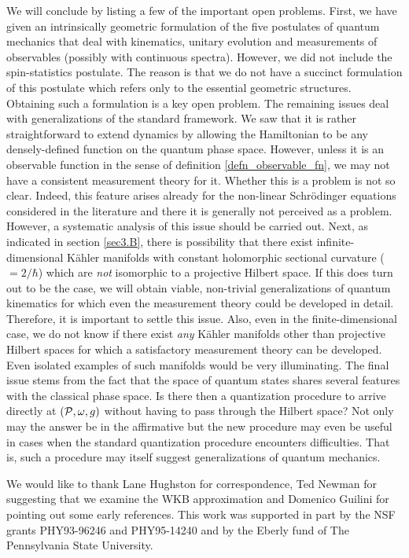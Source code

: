 \documentclass[12pt,aps,eqsecnum,tighten,nofootinbib]{revtex4-2}
\def\P{{\cal P}}
\def\w{\omega}
\begin{document}
We will conclude by listing a few of the important open problems.
First, we have given an intrinsically geometric formulation of the
five postulates of quantum mechanics that deal with kinematics,
unitary evolution and measurements of observables (possibly with
continuous spectra). However, we did not include the spin-statistics
postulate. The reason is that we do not have a succinct formulation of
this postulate which refers only to the essential geometric
structures. Obtaining such a formulation is a key open problem. The
remaining issues deal with generalizations of the standard
framework. We saw that it is rather straightforward to extend dynamics
by allowing the Hamiltonian to be any densely-defined function on the
quantum phase space. However, unless it is an observable function in
the sense of definition \ref{defn_observable_fn}, we may not have a
consistent measurement theory for it.  Whether this is a problem is
not so clear. Indeed, this feature arises already for the non-linear
Schr\"odinger equations considered in the literature and there it is
generally not perceived as a problem.  However, a systematic analysis
of this issue should be carried out. Next, as indicated in section
\ref{sec3.B}, there is possibility that there exist
infinite-dimensional K\"ahler manifolds with constant holomorphic
sectional curvature ($=2/\hbar$) which are {\it not} isomorphic to a
projective Hilbert space. If this does turn out to be the case, we
will obtain viable, non-trivial generalizations of quantum kinematics
for which even the measurement theory could be developed in
detail. Therefore, it is important to settle this issue. Also, even in
the finite-dimensional case, we do not know if there exist {\it any}
K\"ahler manifolds other than projective Hilbert spaces for which a
satisfactory measurement theory can be developed.  Even isolated
examples of such manifolds would be very illuminating. The final issue
stems from the fact that the space of quantum states shares several
features with the classical phase space. Is there then a quantization
procedure to arrive directly at $(\P, \w, g)$ without having to pass
through the Hilbert space? Not only may the answer be in the
affirmative but the new procedure may even be useful in cases when the
standard quantization procedure encounters difficulties. That is, such
a procedure may itself suggest generalizations of quantum mechanics.


\acknowledgements
\vskip20pt
We would like to thank Lane Hughston for correspondence, Ted Newman
for suggesting that we examine the WKB approximation and Domenico
Guilini for pointing out some early references.  This work was
supported in part by the NSF grants PHY93-96246 and PHY95-14240 and by
the Eberly fund of The Pennsylvania State University.
\end{document}
